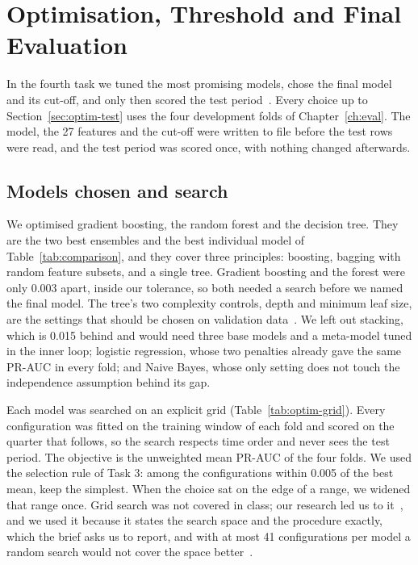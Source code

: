 \documentclass[12pt,a4paper,openany]{report}
\begin{document}
\chapter{Optimisation, Threshold and Final Evaluation}\label{ch:optim}

In the fourth task we tuned the most promising models, chose the final model and its cut-off, and only then scored
the test period~\cite{brief}. Every choice up to Section~\ref{sec:optim-test} uses the four development folds of
Chapter~\ref{ch:eval}. The model, the 27 features and the cut-off were written to file before the test rows were
read, and the test period was scored once, with nothing changed afterwards.

\section{Models chosen and search}\label{sec:optim-search}

We optimised gradient boosting, the random forest and the decision tree. They are the two best ensembles and the
best individual model of Table~\ref{tab:comparison}, and they cover three principles: boosting, bagging with random
feature subsets, and a single tree. Gradient boosting and the forest were only 0.003 apart, inside our tolerance,
so both needed a search before we named the final model. The tree's two complexity controls, depth and minimum leaf
size, are the settings that should be chosen on validation data~\cite{mindd05}. We left out
stacking, which is 0.015 behind and would need three base models and a meta-model tuned in the inner loop; logistic
regression, whose two penalties already gave the same \acs{PR-AUC} in every fold; and Naive Bayes, whose only
setting does not touch the independence assumption behind its gap.

Each model was searched on an explicit grid (Table~\ref{tab:optim-grid}). Every configuration was fitted on the
training window of each fold and scored on the quarter that follows, so the search respects time order and never
sees the test period. The objective is the unweighted mean \acs{PR-AUC} of the four folds. We used the selection
rule of Task 3: among the configurations within 0.005 of the best mean, keep the simplest. When the choice sat on
the edge of a range, we widened that range once. Grid search was not covered in class; our research led us
to it~\cite{sklearn}, and we used it because it states the search space and the procedure exactly, which the brief asks us to report, and with at most 41 configurations
per model a random search would not cover the space better~\cite{sklearn}.
\end{document}
